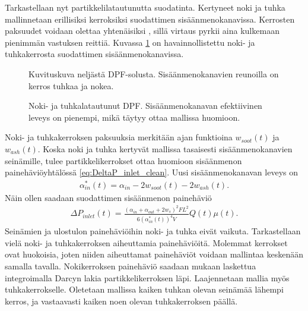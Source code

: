 Tarkastellaan nyt partikkelilatautunutta suodatinta.
Kertyneet noki ja tuhka mallinnetaan erillisiksi kerroksiksi suodattimen sisäänmenokanavissa. Kerrosten paksuudet voidaan  olettaa yhtenäisiksi \cite{Konstandopoulos2000}, sillä virtaus pyrkii aina kulkemaan pienimmän vastuksen reittiä. Kuvassa \ref{fig:hac_dpf_loaded} on havainnollistettu noki- ja tuhkakerrosta suodattimen sisäänmenokanavissa.
\begin{figure}[H]
    \centering 
               {Kuvituskuva neljästä DPF-solusta. Sisäänmenokanavien reunoilla on kerros tuhkaa ja nokea.}
    \caption{Noki- ja tuhkalatautunut DPF. Sisäänmenokanavan efektiivinen leveys on pienempi, mikä täytyy ottaa mallissa huomioon.}
    \label{fig:hac_dpf_loaded}
\end{figure}
Noki- ja tuhkakerroksen paksuuksia merkitään ajan funktioina \(w_{soot}(t)\) ja \(w_{ash}(t)\).
Koska noki ja tuhka kertyvät mallissa tasaisesti sisäänmenokanavien seinämille, tulee partikkelikerrokset ottaa huomioon sisäänmenon painehäviöyhtälössä \eqref{eq:DeltaP_inlet_clean}. Uusi sisäänmenokanavan leveys on 
\begin{align}
    \alpha_{in}^*(t) = \alpha_{in} -2w_{soot}(t)-2w_{ash}(t).
\end{align}
Näin ollen saadaan suodattimen sisäänmenon painehäviö
\begin{align}\label{eq:deltaP_inlet}
    \Delta P_{inlet}(t) =   \frac{(\alpha_{in}+\alpha_{out}+2 w_s)^2FL^2}{6(\alpha_{in}^*(t))^4 V}Q(t) \mu(t).
\end{align}
Seinämien ja ulostulon painehäviöihin noki- ja tuhka eivät vaikuta. 
Tarkastellaan vielä noki- ja tuhkakerroksen aiheuttamia painehäviöitä. Molemmat kerrokset ovat huokoisia, joten niiden aiheuttamat painehäviöt voidaan mallintaa keskenään samalla tavalla. Nokikerroksen painehäviö saadaan \cite{Konstandopoulos2000} mukaan laskettua integroimalla Darcyn lakia partikkelikerroksen läpi. Laajennetaan mallia myös tuhkakerrokselle. Oletetaan mallissa kaiken tuhkan olevan seinämää lähempi kerros, ja vastaavasti kaiken noen olevan tuhkakerroksen päällä.
